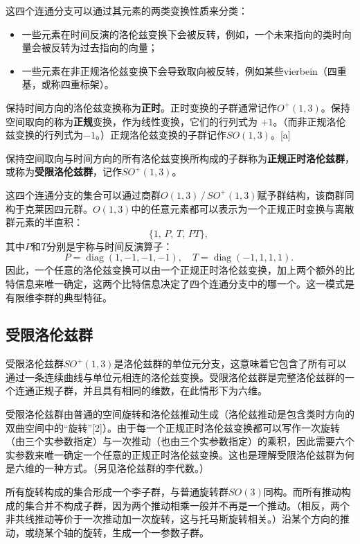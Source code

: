 这四个连通分支可以通过其元素的两类变换性质来分类：
\begin{itemize}
  \item 一些元素在时间反演的洛伦兹变换下会被反转，例如，一个未来指向的类时向量会被反转为过去指向的向量；
  \item 一些元素在非正规洛伦兹变换下会导致取向被反转，例如某些vierbein（四重基，或称四重标架）。
\end{itemize}
保持时间方向的洛伦兹变换称为\textbf{正时}。正时变换的子群通常记作$O^{+}(1,3)$。保持空间取向的称为\textbf{正规}变换，作为线性变换，它们的行列式为 $+1$。（而非正规洛伦兹变换的行列式为$-1$。）正规洛伦兹变换的子群记作$SO(1,3)$。[a]

保持空间取向与时间方向的所有洛伦兹变换所构成的子群称为\textbf{正规正时洛伦兹群}，或称为\textbf{受限洛伦兹群}，记作$SO^{+}(1,3)$。

这四个连通分支的集合可以通过商群$O(1,3)\,/\,SO^{+}(1,3)$赋予群结构，该商群同构于克莱因四元群。$O(1,3)$中的任意元素都可以表示为一个正规正时变换与离散群元素的半直积：
\[
\{1,\, P,\, T,\, PT\},~
\]
其中$P$和$T$分别是宇称与时间反演算子：
\[
P = \operatorname{diag}(1,-1,-1,-1), 
\quad 
T = \operatorname{diag}(-1,1,1,1).~
\]
因此，一个任意的洛伦兹变换可以由一个正规正时洛伦兹变换，加上两个额外的比特信息来唯一确定，这两个比特信息决定了四个连通分支中的哪一个。这一模式是有限维李群的典型特征。
\subsection{受限洛伦兹群}
受限洛伦兹群$SO^{+}(1,3)$是洛伦兹群的单位元分支，这意味着它包含了所有可以通过一条连续曲线与单位元相连的洛伦兹变换。受限洛伦兹群是完整洛伦兹群的一个连通正规子群，并且具有相同的维数，在此情形下为六维。

受限洛伦兹群由普通的空间旋转和洛伦兹推动生成（洛伦兹推动是包含类时方向的双曲空间中的“旋转”[2]）。由于每一个正规正时洛伦兹变换都可以写作一次旋转（由三个实参数指定）与一次推动（也由三个实参数指定）的乘积，因此需要六个实参数来唯一确定一个任意的正规正时洛伦兹变换。这也是理解受限洛伦兹群为何是六维的一种方式。（另见洛伦兹群的李代数。）

所有旋转构成的集合形成一个李子群，与普通旋转群$SO(3)$同构。而所有推动构成的集合并不构成子群，因为两个推动相乘一般并不再是一个推动。（相反，两个非共线推动等价于一次推动加一次旋转，这与托马斯旋转相关。）沿某个方向的推动，或绕某个轴的旋转，生成一个一参数子群。
